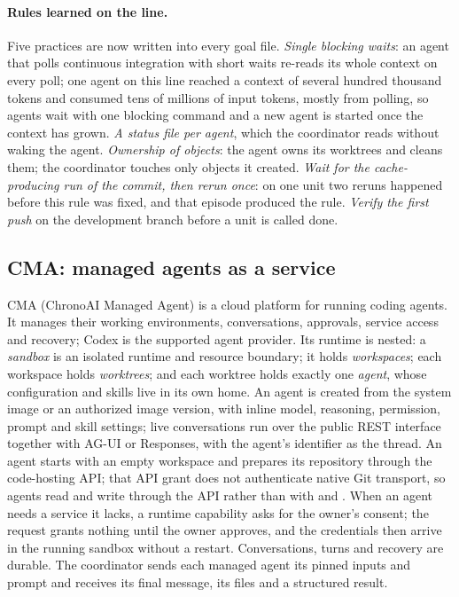 \documentclass[11pt]{article}
\newcommand{\code}[1]{\texttt{\detokenize{#1}}}
\begin{document}
\paragraph{Rules learned on the line.} Five practices are now written into
every goal file. \emph{Single blocking waits}: an agent that polls
continuous integration with short waits re-reads its whole context on every
poll; one agent on this line reached a context of several hundred thousand
tokens and consumed tens of millions of input tokens, mostly from polling, so
agents wait with one blocking command and a new agent is started once the
context has grown. \emph{A status file per agent}, which the coordinator
reads without waking the agent. \emph{Ownership of objects}: the agent owns
its worktrees and cleans them; the coordinator touches only objects it
created. \emph{Wait for the cache-producing run of the commit, then rerun
once}: on one unit two reruns happened before this rule was fixed, and that
episode produced the rule.
\emph{Verify the first push} on the development branch before a unit is
called done.

\subsection{CMA: managed agents as a service}
\label{sec:cma}
CMA (ChronoAI Managed Agent) \citep{cma} is a cloud platform for running
coding agents. It manages their working environments, conversations,
approvals, service access and recovery; Codex is the supported agent
provider. Its runtime is nested: a \emph{sandbox} is an isolated runtime and
resource boundary; it holds \emph{workspaces}; each workspace holds
\emph{worktrees}; and each worktree holds exactly one \emph{agent}, whose
configuration and skills live in its own home. An agent is created from the
system image or an authorized image version, with inline model, reasoning,
permission, prompt and skill settings; live conversations run over the
public REST interface together with AG-UI or Responses, with the agent's
identifier as the thread. An agent starts with an empty workspace and
prepares its repository through the code-hosting API; that API grant does
not authenticate native Git transport, so agents read and write through the
API rather than with \code{git pull} and \code{git push}. When an agent
needs a service it lacks, a runtime capability asks for the owner's consent;
the request grants nothing until the owner approves, and the credentials then
arrive in the running sandbox without a restart. Conversations, turns and
recovery are durable. The coordinator sends each managed agent its pinned
inputs and prompt and receives its final message, its files and a structured
result.
\end{document}
